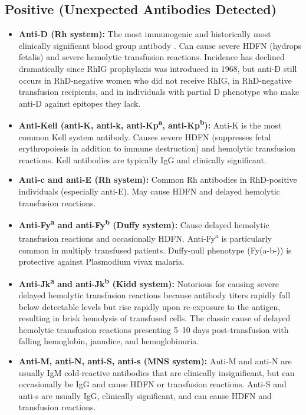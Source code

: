 \subsection*{Positive (Unexpected Antibodies Detected)}
\begin{itemize}
  \item \textbf{Anti-D (Rh system):} The most immunogenic and historically most clinically significant blood group antibody \cite{klein2014mollison}. Can cause severe HDFN (hydrops fetalis) and severe hemolytic transfusion reactions. Incidence has declined dramatically since RhIG prophylaxis was introduced in 1968, but anti-D still occurs in RhD-negative women who did not receive RhIG, in RhD-negative transfusion recipients, and in individuals with partial D phenotype who make anti-D against epitopes they lack.
  \item \textbf{Anti-Kell (anti-K, anti-k, anti-Kp\textsuperscript{a}, anti-Kp\textsuperscript{b}):} Anti-K is the most common Kell system antibody. Causes severe HDFN (suppresses fetal erythropoiesis in addition to immune destruction) and hemolytic transfusion reactions. Kell antibodies are typically IgG and clinically significant.
  \item \textbf{Anti-c and anti-E (Rh system):} Common Rh antibodies in RhD-positive individuals (especially anti-E). May cause HDFN and delayed hemolytic transfusion reactions.
  \item \textbf{Anti-Fy\textsuperscript{a} and anti-Fy\textsuperscript{b} (Duffy system):} Cause delayed hemolytic transfusion reactions and occasionally HDFN. Anti-Fy\textsuperscript{a} is particularly common in multiply transfused patients. Duffy-null phenotype (Fy(a-b-)) is protective against Plasmodium vivax malaria.
  \item \textbf{Anti-Jk\textsuperscript{a} and anti-Jk\textsuperscript{b} (Kidd system):} Notorious for causing severe delayed hemolytic transfusion reactions because antibody titers rapidly fall below detectable levels but rise rapidly upon re-exposure to the antigen, resulting in brisk hemolysis of transfused cells. The classic cause of delayed hemolytic transfusion reactions presenting 5--10 days post-transfusion with falling hemoglobin, jaundice, and hemoglobinuria.
  \item \textbf{Anti-M, anti-N, anti-S, anti-s (MNS system):} Anti-M and anti-N are usually IgM cold-reactive antibodies that are clinically insignificant, but can occasionally be IgG and cause HDFN or transfusion reactions. Anti-S and anti-s are usually IgG, clinically significant, and can cause HDFN and transfusion reactions.

\end{itemize}
